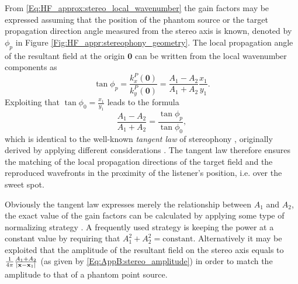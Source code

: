 From \eqref{Eq:HF_approx:stereo_local_wavenumber} the gain factors may be expressed assuming that the position of the phantom source or the target propagation direction angle measured from the stereo axis is known, denoted by $\phi_p$ in Figure \eqref{Fig:HF_appr:stereophony_geometry}.
The local propagation angle of the resultant field at the origin $\mathbf{0}$ can be written from the local wavenumber components as
\begin{equation}
\tan \phi_p = \frac{k_x^P(\mathbf{0})}{k_y^P(\mathbf{0})} = \frac{A_1-A_2}{A_1+A_2}\frac{x_1}{y_1}.
\end{equation}
Exploiting that $\tan \phi_0 = \frac{x_1}{y_1}$ leads to the formula
\begin{equation}
\frac{A_1 - A_2}{A_1 + A_2} = \frac{\tan \phi_p}{\tan \phi_0},
\end{equation}
which is identical to the well-known \emph{tangent law} of stereophony \cite{Pulkki1997, Pulkki2001a, Pulkki2001:phd, SpringerHandbookSpeech2008}, originally derived by applying different considerations \cite{Bennett1985}.
The tangent law therefore ensures the matching of the local propagation directions of the target field and the reproduced wavefronts in the proximity of the listener's position, i.e. over the sweet spot.

Obviously the tangent law expresses merely the relationship between $A_1$ and $A_2$, the exact value of the gain factors can be calculated by applying some type of normalizing strategy \cite{Moore1990}.
A frequently used strategy is keeping the power at a constant value by requiring that $A_1^2 + A_2^2 = \text{constant}$.
Alternatively it may be exploited that the amplitude of the resultant field on the stereo axis equals to $\frac{1}{4\pi}\frac{A_1+A_2}{|\mathbf{x}-\mathbf{x}_1|}$ (as given by \eqref{Eq:AppB:stereo_amplitude}) in order to match the amplitude to that of a phantom point source.

